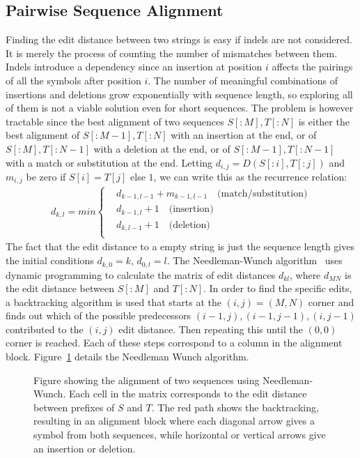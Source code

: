 \subsection{Pairwise Sequence Alignment}
\label{sec:pairwise}
Finding the edit distance between two strings is easy if indels are not considered.
It is merely the process of counting the number of mismatches between them.
Indels introduce a dependency since an insertion at position $i$ affects the pairings of all the symbols after position $i$.
The number of meaningful combinations of insertions and deletions grow exponentially with sequence length, so exploring all of them is not a viable solution even for short sequences.
The problem is however tractable since the best alignment of two sequences $S[:M], T[:N]$ is either the best alignment of $S[:M-1], T[:N]$ with an insertion at the end, or of $S[:M], T[:N-1]$ with a deletion at the end, or of $S[:M-1], T[:N-1]$ with a match or substitution at the end. 
Letting $d_{i,j} = D(S[:i], T[:j])$ and $m_{i,j}$ be zero if $S[i]=T[j]$ else $1$, we can write this as the recurrence relation:
\begin{align*}
  d_{k,l} = min\begin{cases}
  &d_{k-1,l-1}+m_{k-1, l-1}\quad \text{(match/substitution)}\\
  &d_{k-1,l}+1 \quad \text{(insertion)}\\
  &d_{k, l-1}+1 \quad \text{(deletion)}\\
\end{cases}
\end{align*}
The fact that the edit distance to a empty string is just the sequence length gives the initial conditions $d_{k, 0}=k,\,d_{0,l}=l$.
The Needleman-Wunch algorithm~\cite{needlemanwunch} uses dynamic programming to calculate the matrix of edit distances $d_{kl}$, where $d_{MN}$ is the edit distance between $S[:M]$ and $T[:N]$.
In order to find the specific edits, a backtracking algorithm is used that starts at the $(i, j) = (M, N)$ corner and finds out which of the possible predecessors $(i-1, j), (i-1, j-1), (i, j-1)$ contributed to the $(i, j)$ edit distance.
Then repeating this until the $(0, 0)$ corner is reached. Each of these steps correspond to a column in the alignment block.
Figure~\ref{fig:needle} details the Needleman Wunch algorithm.
\begin{figure}
  \begin{tikzpicture}
    
  \end{tikzpicture}
  \caption{Figure showing the alignment of two sequences using Needleman-Wunch. Each cell in the matrix corresponds to the edit distance between prefixes of $S$ and $T$. The red path shows the backtracking, resulting in an alignment block where each diagonal arrow gives a symbol from both sequences, while horizontal or vertical arrows give an insertion or deletion.}
  \label{fig:needle}
\end{figure}

